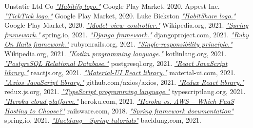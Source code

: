 \documentclass[twoside]{ctuthesis}
\begin{document}
\begin{thebibliography}{99}
            Unstatic Ltd Co
            \href{https://play.google.com/store/apps/details?id=co.unstatic.habitify}{\emph{"Habitify logo."}}
            Google Play Market, 2020.
            Appest Inc.
            \href{https://play.google.com/store/apps/details?id=com.ticktick.task}{\emph{"TickTick logo."}}
            Google Play Market, 2020.
        Luke Bickston
        \href{https://play.google.com/store/apps/details?id=com.habitshareapp}{\emph{"HabitShare logo."}}
        Google Play Market, 2020.
        \href{https://en.wikipedia.org/wiki/Model\%E2\%80\%93view\%E2\%80\%93controller}{\emph{"Model–view–controller."}}
        Wikipedia.org, 2021.
        \href{https://spring.io/}{\emph{"Spring framework."}}
        spring.io, 2021.
        \href{https://www.djangoproject.com/}{\emph{"Django framework."}}
        djangoproject.com, 2021.
        \href{https://spring.io/}{\emph{"Ruby On Rails framework."}}
        rubyonrails.org, 2021.
        \href{https://en.wikipedia.org/wiki/Single-responsibility_principle}{\emph{"Single-responsibility principle."}}
        Wikipedia.org, 2021.
        \href{https://kotlinlang.org/}{\emph{"Kotlin programming language."}}
        kotlinlang.org, 2021.
        \href{https://www.postgresql.org/}{\emph{"PostgreSQL Relational Database."}}
        postgresql.org, 2021.
        \href{https://reactjs.org/}{\emph{"React JavaScript library."}}
        reactjs.org, 2021.
        \href{https://material-ui.com/}{\emph{"Material-UI React library."}}
        material-ui.com, 2021.
        \href{https://github.com/axios/axios}{\emph{"Axios JavaScript library."}}
        github.com/axios/axios, 2021.
        \href{https://redux.js.org/}{\emph{"Redux React library."}}
        redux.js.org, 2021.
        \href{https://www.typescriptlang.org/}{\emph{"TypeScript programming language."}}
        typescriptlang.org, 2021.
        \href{https://www.heroku.com/}{\emph{"Heroku cloud platform."}}
        heroku.com, 2021.
        \href{https://railsware.com/blog/heroku-vs-aws-which-paas-hosting-to-choose/}{\emph{"Heroku vs. AWS – Which PaaS Hosting to Choose?"}}
        railsware.com, 2018.
        \href{https://docs.spring.io/spring-framework/docs/current/reference/html/}{\emph{"Spring framework documentation"}}
        spring.io, 2021.
        \href{https://www.baeldung.com/}{\emph{"Baeldung - Spring tutorials"}}
        baeldung.com, 2021.
    \end{thebibliography}
\end{document}
